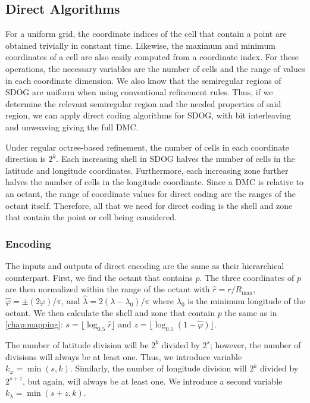 \subsection{Direct Algorithms}
For a uniform grid, the coordinate indices of the cell that contain a point are obtained trivially in constant time.
Likewise, the maximum and minimum coordinates of a cell are also easily computed from a coordinate index.
For these operations, the necessary variables are the number of cells and the range of values in each coordinate dimension.
We also know that the semiregular regions of SDOG are uniform when using conventional refinement rules.
Thus, if we determine the relevant semiregular region and the needed properties of said region, we can apply direct coding algorithms for SDOG, with bit interleaving and unweaving giving the full DMC.


Under regular octree-based refinement, the number of cells in each coordinate direction is $2^k$.
Each increasing shell in SDOG halves the number of cells in the latitude and longitude coordinates.
Furthermore, each increasing zone further halves the number of cells in the longitude coordinate.
Since a DMC is relative to an octant, the range of coordinate values for direct coding are the ranges of the octant itself.
Therefore, all that we need for direct coding is the shell and zone that contain the point or cell being considered.


\subsubsection{Encoding}
The inputs and outputs of direct encoding are the same as their hierarchical counterpart.
First, we find the octant that contains $p$.
The three coordinates of $p$ are then normalized within the range of the octant with $\hat{r} = r / R_\mathrm{max}$, $\hat{\varphi} = \pm (2\varphi) / \pi$, and $\hat{\lambda} = 2 (\lambda - \lambda_0) / \pi$ where $\lambda_0$ is the minimum longitude of the octant.
We then calculate the shell and zone that contain $p$ the same as in \cref{chap:mapping}: $s = \lfloor \log_{0.5} \hat{r} \rfloor$ and $z = \lfloor \log_{0.5} ( 1 - \hat{\varphi} ) \rfloor$.


The number of latitude division will be $2^k$ divided by $2^s$; however, the number of divisions will always be at least one.
Thus, we introduce variable $k_\varphi = \min ( s, k )$.
Similarly, the number of longitude division will $2^k$ divided by $2^{s+z}$, but again, will always be at least one.
We introduce a second variable $k_\lambda = \min ( s + z, k )$.



